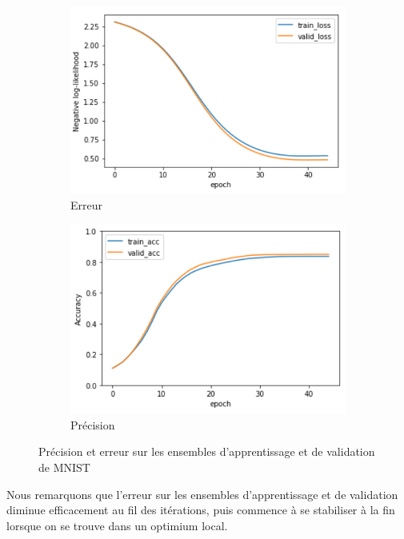 \documentclass[a4paper,english,12pt]{article}
\begin{document}
\begin{figure}[H]
	\centering
	\begin{subfigure}{0.45\textwidth}
		\includegraphics[width=\textwidth]{error_mnist}
		\caption{Erreur}
	\end{subfigure}
	\begin{subfigure}{0.45\textwidth}
		\includegraphics[width=\textwidth]{accuracy_mnist}
		\caption{Précision}
	\end{subfigure}
	\caption{Précision et erreur sur les ensembles d'apprentissage et de validation de MNIST}
\end{figure}

Nous remarquons que l'erreur sur les ensembles d'apprentissage et de validation diminue efficacement au fil des itérations, puis commence à se stabiliser à la fin lorsque on se trouve dans un optimium local.
\end{document}
